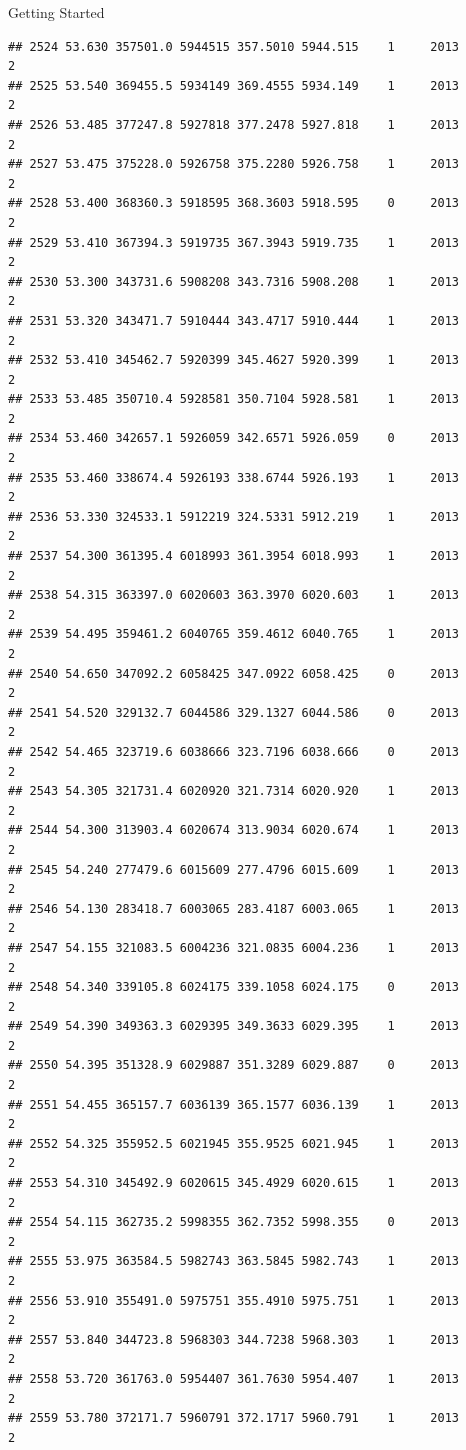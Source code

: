 \documentclass[
  ignorenonframetext,
]{beamer}
\begin{document}
\begin{frame}[fragile]{Getting Started}
\begin{verbatim}
## 2524 53.630 357501.0 5944515 357.5010 5944.515    1     2013        2
## 2525 53.540 369455.5 5934149 369.4555 5934.149    1     2013        2
## 2526 53.485 377247.8 5927818 377.2478 5927.818    1     2013        2
## 2527 53.475 375228.0 5926758 375.2280 5926.758    1     2013        2
## 2528 53.400 368360.3 5918595 368.3603 5918.595    0     2013        2
## 2529 53.410 367394.3 5919735 367.3943 5919.735    1     2013        2
## 2530 53.300 343731.6 5908208 343.7316 5908.208    1     2013        2
## 2531 53.320 343471.7 5910444 343.4717 5910.444    1     2013        2
## 2532 53.410 345462.7 5920399 345.4627 5920.399    1     2013        2
## 2533 53.485 350710.4 5928581 350.7104 5928.581    1     2013        2
## 2534 53.460 342657.1 5926059 342.6571 5926.059    0     2013        2
## 2535 53.460 338674.4 5926193 338.6744 5926.193    1     2013        2
## 2536 53.330 324533.1 5912219 324.5331 5912.219    1     2013        2
## 2537 54.300 361395.4 6018993 361.3954 6018.993    1     2013        2
## 2538 54.315 363397.0 6020603 363.3970 6020.603    1     2013        2
## 2539 54.495 359461.2 6040765 359.4612 6040.765    1     2013        2
## 2540 54.650 347092.2 6058425 347.0922 6058.425    0     2013        2
## 2541 54.520 329132.7 6044586 329.1327 6044.586    0     2013        2
## 2542 54.465 323719.6 6038666 323.7196 6038.666    0     2013        2
## 2543 54.305 321731.4 6020920 321.7314 6020.920    1     2013        2
## 2544 54.300 313903.4 6020674 313.9034 6020.674    1     2013        2
## 2545 54.240 277479.6 6015609 277.4796 6015.609    1     2013        2
## 2546 54.130 283418.7 6003065 283.4187 6003.065    1     2013        2
## 2547 54.155 321083.5 6004236 321.0835 6004.236    1     2013        2
## 2548 54.340 339105.8 6024175 339.1058 6024.175    0     2013        2
## 2549 54.390 349363.3 6029395 349.3633 6029.395    1     2013        2
## 2550 54.395 351328.9 6029887 351.3289 6029.887    0     2013        2
## 2551 54.455 365157.7 6036139 365.1577 6036.139    1     2013        2
## 2552 54.325 355952.5 6021945 355.9525 6021.945    1     2013        2
## 2553 54.310 345492.9 6020615 345.4929 6020.615    1     2013        2
## 2554 54.115 362735.2 5998355 362.7352 5998.355    0     2013        2
## 2555 53.975 363584.5 5982743 363.5845 5982.743    1     2013        2
## 2556 53.910 355491.0 5975751 355.4910 5975.751    1     2013        2
## 2557 53.840 344723.8 5968303 344.7238 5968.303    1     2013        2
## 2558 53.720 361763.0 5954407 361.7630 5954.407    1     2013        2
## 2559 53.780 372171.7 5960791 372.1717 5960.791    1     2013        2

\end{verbatim}
\end{frame}
\end{document}
